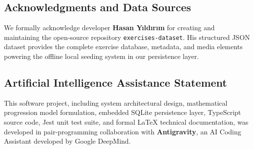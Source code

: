\subsection{Acknowledgments and Data Sources}
We formally acknowledge developer \textbf{Hasan Yıldırım} for creating and maintaining the open-source repository \texttt{exercises-dataset}. His structured JSON dataset provides the complete exercise database, metadata, and media elements powering the offline local seeding system in our persistence layer.

\subsection{Artificial Intelligence Assistance Statement}
This software project, including system architectural design, mathematical progression model formulation, embedded SQLite persistence layer, TypeScript source code, Jest unit test suite, and formal LaTeX technical documentation, was developed in pair-programming collaboration with \textbf{Antigravity}, an AI Coding Assistant developed by Google DeepMind.

